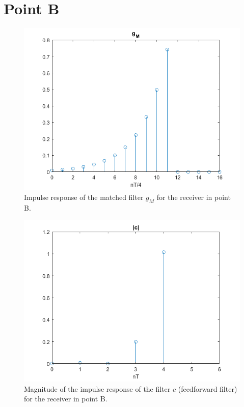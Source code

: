 \documentclass[a4paper,11.5pt]{article}
\begin{document}
\section*{Point B}

\begin{figure}[ht]
	\begin{center}   
		\includegraphics[width=\textwidth]{figs/B_gm.png} 
		\caption{Impulse response of the matched filter $g_{M}$ for the receiver in point B.}
		\label{fig:B_gm}
	\end{center}
\end{figure}

\begin{figure}[ht]
	\begin{center}   
		\includegraphics[width=\textwidth]{figs/B_c.png} 
		\caption{Magnitude of the impulse response of the filter $c$ (feedforward filter) for the receiver in point B.}
		\label{fig:B_c}
	\end{center}
\end{figure}
\end{document}
